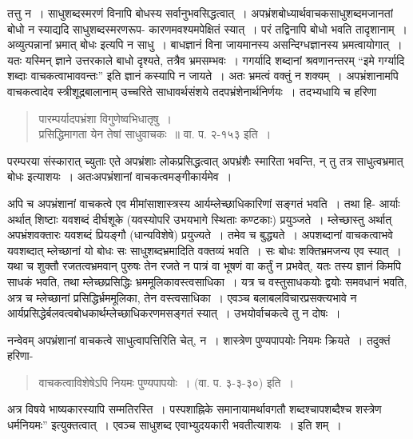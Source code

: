 {तत्तु न~। साधुशब्दस्मरणं विनापि बोधस्य सर्वानुभवसिद्धत्वात्~। अपभ्रंशबोध्यार्थवाचकसाधुशब्दमजानतां बोधो न स्याद्यदि साधुशब्दस्मरणरूप- कारणमवश्यमपेक्षितं स्यात्~। परं तद्विनापि बोधो भवति तादृशानाम्~। अव्युत्पन्नानां भ्रमात् बोधः इत्यपि न साधु~। बाधज्ञानं विना जायमानस्य असन्दिग्धज्ञानस्य भ्रमत्वायोगात्~। यतः यस्मिन् ज्ञाने उत्तरकाले बाधो दृश्यते, तत्रैव भ्रमसम्भवः~। गगर्यादि शब्दानां श्रवणानन्तरम् “इमे गर्ग्यादि शब्दाः वाचकत्वाभाववन्तः” इति ज्ञानं कस्यापि न जायते~। अतः भ्रमत्वं वक्तुं न शक्यम्~। अपभ्रंशानामपि वाचकत्वादेव स्त्रीशूद्रबालानाम् उच्चरिते साधावर्थसंशये तदपभ्रंशेनार्थनिर्णयः~। तदभ्यधायि च हरिणा 
\begin{verse}
पारम्पर्यादपभ्रंशा विगुणेष्वभिधातृषु~। \\
प्रसिद्धिमागता येन तेषां साधुवाचकः~॥ वा. प. २-१५३ इति~। 
\end{verse}
परम्परया संस्कारात् च्युताः एते अपभ्रंशाः लोकप्रसिद्धत्वात्  अपभ्रंशैः स्मारिता भवन्ति, न् तु तत्र साधुत्वभ्रमात् बोधः इत्याशयः~। अतःअपभ्रंशानां वाचकत्वमङ्गीकार्यमेव~। 

अपि च अपभ्रंशानां वाचकत्वे एव मीमांसाशास्त्रस्य आर्यम्लेच्छाधिकारिणां सङ्गतं भवति~। तथा हि- आर्याः अर्थात् शिष्टाः यवशब्दं दीर्घशूके (यवस्योपरि उभयभागे स्थिताः कण्टकाः) प्रयुञ्जते~। म्लेच्छास्तु अर्थात् अपभ्रंशवक्तारः यवशब्दं प्रियङ्गौ (धान्यविशेषे) प्रयुज्यते~। तमेव च बुद्ध्यते~। अपशब्दानां वाचकत्वाभवे यवशब्दात् म्लेच्छानां यो बोधः सः साधुशब्दभ्रमादिति वक्तव्यं भवति~। सः बोधः शक्तिभ्रमजन्य एव स्यात्~। यथा च शुक्तौ रजतत्वभ्रमवान् पुरुषः तेन रजते न पात्रं वा भूषणं वा कर्तुं न प्रभवेत्, यतः तस्य ज्ञानं किमपि साधकं भवति, तथा म्लेच्छप्रसिद्धिः भ्रममूलिकावस्त्वसाधिका~। यत्र च वस्तुसाधकयोः द्वयोः समवधानं भवति, अत्र च म्लेच्छानां प्रसिद्धिर्भ्रममूलिका, तेन वस्त्वसाधिका~। एवञ्च बलाबलविचारप्रसक्त्यभावे न आर्यप्रसिद्धेर्बलवत्वबोधकार्थम्लेच्छाधिकरणमसङ्गतं स्यात्~। उभयोर्वाचकत्वे तु न दोषः~। 

नन्वेवम् अपभ्रंशानां वाचकत्वे साधुत्वापत्तिरिति चेत्, न~। शास्त्रेण पुण्यपापयोः नियमः क्रियते~। तदुक्तं हरिणा-
\begin{verse}
वाचकत्वाविशेषेऽपि नियमः पुण्यपापयोः~। (वा. प. ३-३-३०) इति~। 
\end{verse}
अत्र विषये भाष्यकारस्यापि सम्मतिरस्ति~। पस्पशाह्निके समानायामर्थावगतौ शब्दश्चापशब्दैश्च शस्त्रेण धर्मनियमः” इत्युक्तत्वात्~। एवञ्च साधुशब्द एवाभ्युदयकारी भवतीत्याशयः~। इति शम्~। 

\articleend
}
